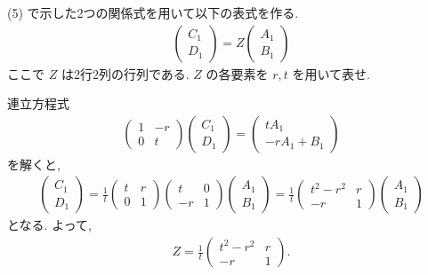 \documentclass[../../ou-physics-exam.tex]{subfiles}
\begin{document}
(5) で示した2つの関係式を用いて以下の表式を作る.
\begin{align*}
    \begin{pmatrix}
        C_1 \\ D_1
    \end{pmatrix} = Z
    \begin{pmatrix}
        A_1 \\ B_1
    \end{pmatrix}
\end{align*}
ここで $ Z $ は2行2列の行列である. 
$ Z $ の各要素を $ r, t $ を用いて表せ.
\begin{answer}
    連立方程式
    \begin{align*}
        \begin{pmatrix}
            1 & -r \\
            0 & t
        \end{pmatrix}
        \begin{pmatrix}
            C_1 \\ D_1
        \end{pmatrix} =
        \begin{pmatrix}
            tA_1 \\ -rA_1 + B_1
        \end{pmatrix}
    \end{align*}
    を解くと,
    \begin{align*}
        \begin{pmatrix}
            C_1 \\ D_1
        \end{pmatrix}
        = \frac{1}{t} 
        \begin{pmatrix}
            t & r \\
            0 & 1
        \end{pmatrix}
        \begin{pmatrix}
            t & 0 \\
            -r & 1
        \end{pmatrix}
        \begin{pmatrix}
            A_1 \\ B_1
        \end{pmatrix}
        = \frac{1}{t} 
        \begin{pmatrix}
            t^2 - r^2 & r \\
            -r & 1
        \end{pmatrix}
        \begin{pmatrix}
            A_1 \\ B_1
        \end{pmatrix}
    \end{align*}
    となる. 
    よって,
    \begin{align*}
        Z = \frac{1}{t} 
        \begin{pmatrix}
            t^2 - r^2 & r \\
            -r & 1
        \end{pmatrix}.
    \end{align*}
\end{answer}
\end{document}
